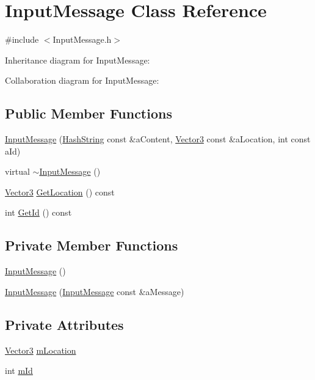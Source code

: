 \hypertarget{classInputMessage}{}\section{Input\+Message Class Reference}
\label{classInputMessage}


{\ttfamily \#include $<$Input\+Message.\+h$>$}



Inheritance diagram for Input\+Message\+:


Collaboration diagram for Input\+Message\+:
\subsection*{Public Member Functions}
\begin{DoxyCompactItemize}
\item 
\hyperlink{classInputMessage_aa7b004c34cef69ef04c80bcba9c61a63}{Input\+Message} (\hyperlink{classHashString}{Hash\+String} const \&a\+Content, \hyperlink{structVector3}{Vector3} const \&a\+Location, int const a\+Id)
\item 
virtual \hyperlink{classInputMessage_a59e8d3dbc58049b72563c9c44847e405}{$\sim$\+Input\+Message} ()
\item 
\hyperlink{structVector3}{Vector3} \hyperlink{classInputMessage_a2c049b70601f0a6187fdc371299a480f}{Get\+Location} () const 
\item 
int \hyperlink{classInputMessage_a79bfa8e6b54ec8a071ada87c6248f8b0}{Get\+Id} () const 
\end{DoxyCompactItemize}
\subsection*{Private Member Functions}
\begin{DoxyCompactItemize}
\item 
\hyperlink{classInputMessage_ac25043d697ff075d054d690252cd7633}{Input\+Message} ()
\item 
\hyperlink{classInputMessage_aa524b4cdc504c2e2d4301acfc7c64522}{Input\+Message} (\hyperlink{classInputMessage}{Input\+Message} const \&a\+Message)
\end{DoxyCompactItemize}
\subsection*{Private Attributes}
\begin{DoxyCompactItemize}
\item 
\hyperlink{structVector3}{Vector3} \hyperlink{classInputMessage_af0ade79483de1bf81cc8a32db2aa12a8}{m\+Location}
\item 
int \hyperlink{classInputMessage_a9aff6b058361938fbffeed7ae4a12663}{m\+Id}
\end{DoxyCompactItemize}
